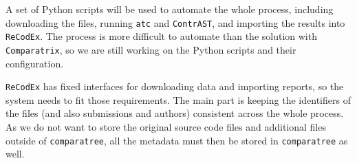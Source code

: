 A set of Python scripts will be used to automate the whole process, including downloading the files, running \texttt{atc} and \texttt{ContrAST}, and importing the results into \texttt{ReCodEx}.
The process is more difficult to automate than the solution with \texttt{Comparatrix}, so we are still working on the Python scripts and their configuration.

\texttt{ReCodEx} has fixed interfaces for downloading data and importing reports, so the system needs to fit those requirements.
The main part is keeping the identifiers of the files (and also submissions and authors) consistent across the whole process.
As we do not want to store the original source code files and additional files outside of \texttt{comparatree}, all the metadata must then be stored in \texttt{comparatree} as well.
